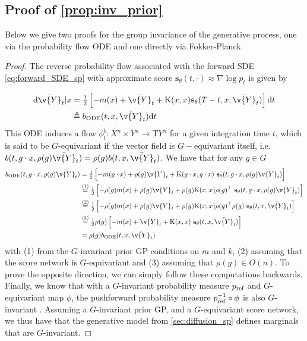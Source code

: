\subsection{Proof of \cref{prop:inv_prior}}
\label{sec:proof_inv_prior}
Below we give two proofs for the group invariance of the generative process, one via the probability flow ODE and one directly via Fokker-Planck.

\begin{proof}
	The reverse probability flow associated with the forward SDE \eqref{eq:forward_SDE_sp} with approximate score $\mathbf{s}_\theta(t, \cdot) \approx \nabla \log p_t$ is given by 

	\begin{align} \label{eq:backward_ODE_sp} \mathrm{d} \bar{\v{Y}}_t|x &= \tfrac{1}{2} \left[-m(x) + \bar{\v{Y}}_t + \mathrm{K}(x,x) \mathbf{s}_\theta(T - t, x, \bar{\v{Y}}_t) \right] \mathrm{d} t \\ & \triangleq b_{\text{ODE}}(t, x, \bar{\v{Y}}_t) \mathrm{d} t \end{align} This ODE induces a flow $\phi^b_t: X^n \times Y^n \rightarrow \mathrm{T}Y^n$ for a given integration time $t$, which is said to be $G$-equivariant if the vector field is $G-$equivariant itself, i.e.\ $b(t, g\cdot x, \rho(g) \bar{\v{Y}}_t) = \rho(g) b(t, x, \bar{\v{Y}}_t)$.
	We have that for any $g \in G$ \begin{align} b_{\text{ODE}}(t, g\cdot x, \rho(g) \bar{\v{Y}}_t) &= \tfrac{1}{2} \left[ -m(g \cdot x) + \rho(g) \v{Y}_t + \mathrm{K}(g \cdot x,g \cdot x) ~\mathbf{s}_\theta(t, g \cdot x, \rho(g) \bar{\v{Y}}_t) \right] \\ &\overset{(1)}{=} \tfrac{1}{2} \left[-\rho(g)m(x) + \rho(g) \v{Y}_t + \rho(g) \mathrm{K}(x,x)\rho(g)^\top ~\mathbf{s}_\theta(t, g \cdot x, \rho(g) \bar{\v{Y}}_t) \right] \\ &\overset{(2)}{=} \tfrac{1}{2} \left[-\rho(g)m(x) + \rho(g) \v{Y}_t + \rho(g) \mathrm{K}(x,x)\rho(g)^\top \rho(g) ~\mathbf{s}_\theta(t, x, \bar{\v{Y}}_t) \right] \\ &\overset{(3)}{=} \tfrac{1}{2} \rho(g) \left[-m(x) + \v{Y}_t + \mathrm{K}(x,x) ~\mathbf{s}_\theta(t, x, \bar{\v{Y}}_t) \right] \\ &\overset{}{=} \rho(g) b_{\text{ODE}}(t, x, \bar{\v{Y}}_t) \end{align} with (1) from the $G$-invariant prior GP conditions on $m$ and $k$, (2) assuming that the score network is $G$-equivariant and (3) assuming that $\rho(g) \in O(n)$.
	To prove the opposite direction, we can simply follow these computations backwards.
	Finally, we know that with a $G$-invariant probability measure $p_{\textup{ref}}$ and $G$-equivariant map $\phi$, the pushforward probability measure $p_{\textup{ref}}^{-1} \circ \phi$ is also $G$-invariant \parencite{kohler2020equivariant,papamakarios2019normalizing}.
	Assuming a $G$-invariant prior GP, and a $G$-equivariant score network, we thus have that the generative model from \cref{sec:diffusion_sp} defines marginals that are $G$-invariant.
\end{proof}

